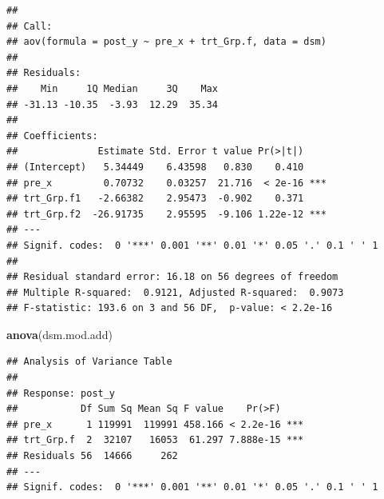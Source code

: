 \documentclass[
]{book}
\newenvironment{Shaded}{\begin{snugshade}}{\end{snugshade}}
\newcommand{\AttributeTok}[1]{\textcolor[rgb]{0.13,0.29,0.53}{#1}}
\newcommand{\DecValTok}[1]{\textcolor[rgb]{0.00,0.00,0.81}{#1}}
\newcommand{\FunctionTok}[1]{\textcolor[rgb]{0.13,0.29,0.53}{\textbf{#1}}}
\newcommand{\NormalTok}[1]{#1}
\newcommand{\OtherTok}[1]{\textcolor[rgb]{0.56,0.35,0.01}{#1}}
\newcommand{\SpecialCharTok}[1]{\textcolor[rgb]{0.81,0.36,0.00}{\textbf{#1}}}
\newcommand{\StringTok}[1]{\textcolor[rgb]{0.31,0.60,0.02}{#1}}
\begin{document}
\begin{Shaded}
\end{Shaded}

\begin{verbatim}
## 
## Call:
## aov(formula = post_y ~ pre_x + trt_Grp.f, data = dsm)
## 
## Residuals:
##    Min     1Q Median     3Q    Max 
## -31.13 -10.35  -3.93  12.29  35.34 
## 
## Coefficients:
##              Estimate Std. Error t value Pr(>|t|)    
## (Intercept)   5.34449    6.43598   0.830    0.410    
## pre_x         0.70732    0.03257  21.716  < 2e-16 ***
## trt_Grp.f1   -2.66382    2.95473  -0.902    0.371    
## trt_Grp.f2  -26.91735    2.95595  -9.106 1.22e-12 ***
## ---
## Signif. codes:  0 '***' 0.001 '**' 0.01 '*' 0.05 '.' 0.1 ' ' 1
## 
## Residual standard error: 16.18 on 56 degrees of freedom
## Multiple R-squared:  0.9121, Adjusted R-squared:  0.9073 
## F-statistic: 193.6 on 3 and 56 DF,  p-value: < 2.2e-16
\end{verbatim}

\begin{Shaded}
\begin{Highlighting}[]
\FunctionTok{anova}\NormalTok{(dsm.mod.add)}
\end{Highlighting}
\end{Shaded}

\begin{verbatim}
## Analysis of Variance Table
## 
## Response: post_y
##           Df Sum Sq Mean Sq F value    Pr(>F)    
## pre_x      1 119991  119991 458.166 < 2.2e-16 ***
## trt_Grp.f  2  32107   16053  61.297 7.888e-15 ***
## Residuals 56  14666     262                      
## ---
## Signif. codes:  0 '***' 0.001 '**' 0.01 '*' 0.05 '.' 0.1 ' ' 1
\end{verbatim}
\end{document}
